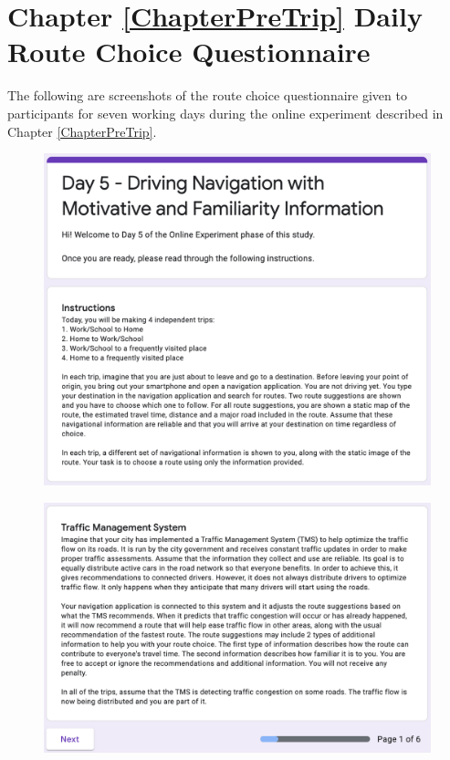\chapter{Chapter \ref{ChapterPreTrip} Daily Route Choice Questionnaire}
\label{AppendixF}

The following are screenshots of the route choice questionnaire given to participants for seven working days during the online experiment described in Chapter \ref{ChapterPreTrip}. 

\begin{figure}[h]
  \centering
  \includegraphics[scale=0.6]{figures/f-daily1.png}
\end{figure}

\begin{figure}[h]
  \centering
  \includegraphics[scale=0.6]{figures/f-daily2.png}
\end{figure}

